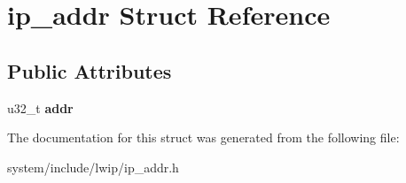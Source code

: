 \hypertarget{structip__addr}{}\section{ip\+\_\+addr Struct Reference}
\label{structip__addr}
\subsection*{Public Attributes}
\begin{DoxyCompactItemize}
\item 
\hypertarget{structip__addr_ae21beaba54c79518c4b77b279f744c21}{}u32\+\_\+t {\bfseries addr}\label{structip__addr_ae21beaba54c79518c4b77b279f744c21}

\end{DoxyCompactItemize}


The documentation for this struct was generated from the following file\+:\begin{DoxyCompactItemize}
\item 
system/include/lwip/ip\+\_\+addr.\+h\end{DoxyCompactItemize}
